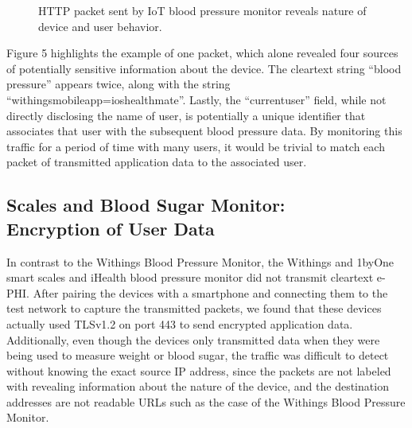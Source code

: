 \begin{figure}[t]
  \centering
  \caption{HTTP packet sent by IoT blood pressure monitor reveals nature of device and user behavior.}
  \label{fig:bp-packet}
\end{figure}

Figure 5 highlights the example of one packet, which alone revealed four sources
of potentially sensitive information about the device. The cleartext string ``blood\textunderscore
pressure'' appears twice, along with the string ``withings\textunderscore mobile\textunderscore app=ios\textunderscore healthmate''. Lastly, the ``current\textunderscore user'' field, while not directly disclosing the name of user, is potentially a unique identifier that associates that user with the subsequent blood pressure data. By monitoring this traffic for a period of time with many users, it would be trivial to match each packet of transmitted application data to the associated user. 

\subsection{Scales and Blood Sugar Monitor: \\ Encryption of User Data}

In contrast to the Withings Blood Pressure Monitor, the Withings and 1byOne
smart scales and iHealth blood pressure monitor did not transmit cleartext
e-PHI. After pairing the devices with a smartphone and connecting them to the
test network to capture the transmitted packets, we found that these devices
actually used TLSv1.2 on port 443 to send encrypted application data.
Additionally, even though the devices only transmitted data when they were
being used to measure weight or blood sugar, the traffic was difficult to
detect without knowing the exact source IP address, since the packets are not
labeled with revealing information about the nature of the device, and the
destination addresses are not readable URLs such as the case of the Withings
Blood Pressure Monitor.

